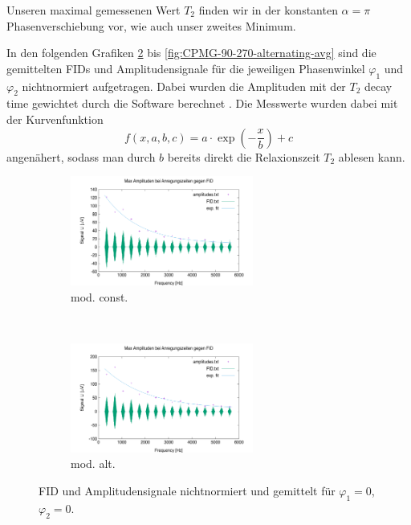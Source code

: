 \documentclass[../../main.tex]{subfiles}
\begin{document}
            Unseren maximal gemessenen Wert $T_2$ finden wir in der konstanten $\alpha = \pi$ Phasenverschiebung vor, wie auch unser zweites Minimum.

            In den folgenden Grafiken \ref{fig:CPMG-0-0-alternating-avg} bis \ref{fig:CPMG-90-270-alternating-avg} sind die gemittelten FIDs und Amplitudensignale für die jeweiligen Phasenwinkel $\varphi_1$ und $\varphi_2$ nichtnormiert aufgetragen. Dabei wurden die Amplituden mit der $T_2$ decay time gewichtet durch die Software berechnet \cite[ch 5.3.1]{doc:EFNMRStudentManual}. Die Messwerte wurden dabei mit der Kurvenfunktion 
            \[
                f(x,a,b,c) = a\cdot \exp(-\frac{x}{b}) + c
            \]
            angenähert, sodass man durch $b$ bereits direkt die Relaxionszeit $T_2$ ablesen kann. 
        \begin{figure}[H]
            \centering
            \begin{subfigure}[b]{0.4\textwidth}
                \centering
                \includegraphics[width=6cm]{Bilddateien/10/CPMG-0-0-constant-avg.png}
                \caption{mod. const.}
                \label{fig:CPMG-0-0-constant-avg}
            \end{subfigure}
            \
            \begin{subfigure}[b]{0.4\textwidth}
                \centering
                \includegraphics[width=6cm]{Bilddateien/10/CPMG-0-0-alternating-avg.png}
                \caption{mod. alt.}
                \label{fig:CPMG-0-0-alternating-avg}
            \end{subfigure}
            \caption{FID und Amplitudensignale nichtnormiert und gemittelt für $\varphi_1 = 0$, $\varphi_2 = 0$.}
            \label{fig:CPMG-0-0-avg}
        \end{figure}
\end{document}
